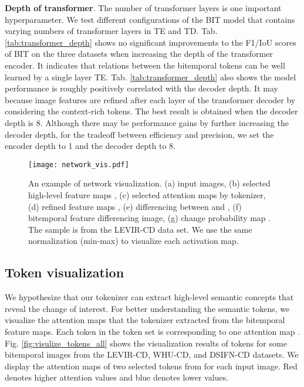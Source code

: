 \documentclass[journal]{IEEEtran}
\begin{document}
\textbf{Depth of transformer}. The number of transformer layers is one important hyperparameter. We test different configurations of the BIT model that contains varying numbers of transformer layers in TE and TD. Tab. \ref{tab:transformer_depth} shows no significant improvements to the F1/IoU scores of BIT on the three datasets when increasing the depth of the transformer encoder. It indicates that relations between the bitemporal tokens can be well learned by a single layer TE. Tab. \ref{tab:transformer_depth} also shows the model performance is roughly positively correlated with the decoder depth. It may because image features are refined after each layer of the transformer decoder by considering the context-rich tokens. The best result is obtained when the decoder depth is 8. Although there may be performance gains by further increasing the decoder depth, for the tradeoff between efficiency and precision, we set the encoder depth to 1 and the decoder depth to 8.

\begin{figure*}
    \centering
    \texttt{[image: network\_vis.pdf]}
    \caption{An example of network visualization. (a) input images, (b) selected high-level feature maps , (c) selected attention maps  by tokenizer, (d) refined feature maps , (e) differencing between  and , (f) bitemporal feature differencing image, (g) change probability map . The sample is from the LEVIR-CD data set. We use the same normalization (min-max) to visualize each activation map.}
    \label{fig:network_vis}
\end{figure*}

\subsection{Token visualization}

We hypothesize that our tokenizer can extract high-level semantic concepts that reveal the change of interest. For better understanding the semantic tokens, we visualize the attention maps  that the tokenizer extracted from the bitemporal feature maps. Each token  in the token set  is corresponding to one attention map . Fig. \ref{fig:visulize_tokens_all} shows the visualization results of tokens for some bitemporal images from the LEVIR-CD, WHU-CD, and DSIFN-CD datasets. We display the attention maps of two selected tokens from  for each input image. Red denotes higher attention values and blue denotes lower values. 
\end{document}
